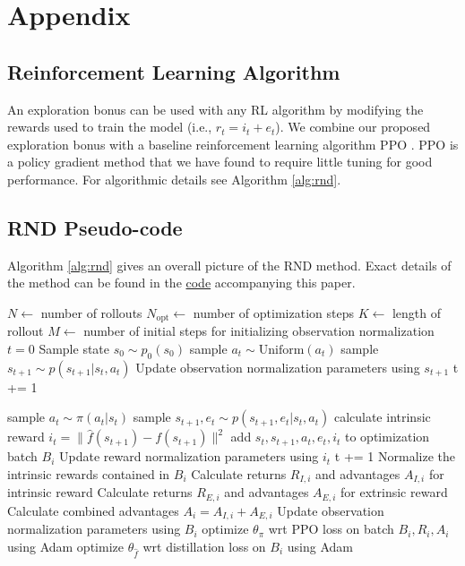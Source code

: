 \documentclass{article} %
\begin{document}
\appendix
\section{Appendix}
\subsection{Reinforcement Learning Algorithm}
An exploration bonus can be used with any RL algorithm by modifying the rewards used to train the model (i.e., $r_t = i_t + e_t$). We combine our proposed exploration bonus with a baseline reinforcement learning algorithm PPO \citep{ppo}. PPO is a policy gradient method that we have found to require little tuning for good performance. For algorithmic details see Algorithm \ref{alg:rnd}.
\subsection{RND Pseudo-code}
Algorithm \ref{alg:rnd} gives an overall picture of the RND method. Exact details of the method can be found in the \href{https://github.com/openai/random-network-distillation}{code} accompanying this paper.
\begin{algorithm}[!ht]
    \caption{RND pseudo-code}
    \label{alg:rnd}
    \begin{algorithmic}
        \STATE $N \gets$  number of rollouts
        \STATE $N_{\text{opt}} \gets$ number of optimization steps
        \STATE $K \gets$ length of rollout
        \STATE $M \gets$ number of initial steps for initializing observation normalization 
        \STATE $t=0$ 
        \STATE Sample state $s_0\sim p_0(s_0)$
            \STATE sample $a_t \sim \text{Uniform}(a_t)$
            \STATE sample $s_{t+1} \sim p(s_{t+1} | s_t, a_t)$
            \STATE Update observation normalization parameters using $s_{t+1}$
            \STATE t += 1
            
        \ENDFOR
               \STATE sample $a_t \sim \pi(a_t|s_t)$
               \STATE sample $s_{t+1}, e_{t} \sim p(s_{t+1}, e_{t} | s_t, a_t)$
               \STATE calculate intrinsic reward $i_t = \lVert \hat{f}(s_{t+1}) - f(s_{t+1}) \rVert^2$
               \STATE add $s_t, s_{t+1}, a_t, e_t, i_t$ to optimization batch $B_{i}$
               \STATE Update reward normalization parameters using $i_{t}$
               \STATE t += 1
            \ENDFOR
            \STATE Normalize the intrinsic rewards contained in $B_i$
            \STATE Calculate returns $R_{I,i}$ and advantages $A_{I,i}$ for intrinsic reward
            \STATE Calculate returns $R_{E,i}$ and advantages $A_{E,i}$ for extrinsic reward
            \STATE Calculate combined advantages $A_i = A_{I, i} + A_{E,i}$
            \STATE Update observation normalization parameters using $B_i$
            \STATE optimize $\theta_{\pi}$ wrt PPO loss on batch $B_i, R_i, A_i$ using Adam
            \STATE optimize $\theta_{\hat{f}}$ wrt distillation loss on $B_i$ using Adam
            \ENDFOR
        \ENDFOR
    \end{algorithmic}
    \end{algorithm}
\end{document}
